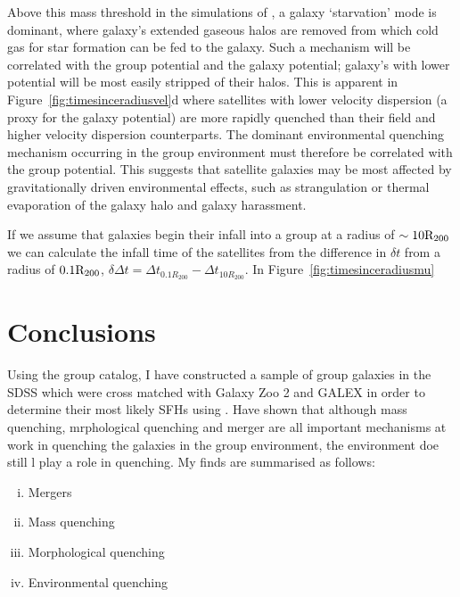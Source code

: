 Above this mass threshold in the simulations of \cite{fillingham16}, a galaxy `starvation' mode \citep{larson80, balogh90} is dominant, where galaxy's extended gaseous halos are removed from which cold gas for star formation can be fed to the galaxy. Such a mechanism will be correlated with the group potential and the galaxy potential; galaxy's with lower potential will be most easily stripped of their halos. This is apparent in Figure~\ref{fig:timesinceradiusvel}d where satellites with lower velocity dispersion (a proxy for the galaxy potential) are more rapidly quenched than their field and higher velocity dispersion counterparts. The dominant environmental quenching mechanism occurring in the group environment must therefore be correlated with the group potential. This suggests that satellite galaxies may be most affected by gravitationally driven environmental effects, such as strangulation or thermal evaporation of the galaxy halo and galaxy harassment. 

If we assume that galaxies begin their infall into a group at a radius of $\sim10\rm{R}_{200}$ we can calculate the infall time of the satellites from the difference in $\delta t$ from a radius of $0.1 \rm{R}_{200}$, $\delta \Delta t = \Delta t_{0.1R_{200}} - \Delta t_{10 R_{200}}$. In Figure~\ref{fig:timesinceradiusmu}

\section{Conclusions}\label{sec:conc}

Using the \citet{berlind06} group catalog, I have constructed a sample of group galaxies in the SDSS which were cross matched with Galaxy Zoo 2 and GALEX in order to determine their most likely SFHs using \starpy. Have shown that although mass quenching, mrphological quenching and merger are all important mechanisms at work in quenching the galaxies in the group environment, the environment doe still l play a role in quenching. My finds are summarised as follows:
\begin{enumerate}[(i)]
\item Mergers
 
\item Mass quenching
 
 \item Morphological quenching
 
 \item Environmental quenching
 
\end{enumerate}

